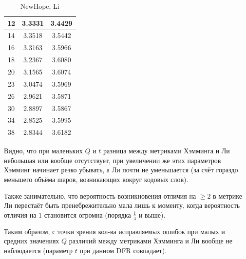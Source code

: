 \begin{table}[h]
\begin{minipage}{0.48\textwidth}
\begin{tabular}{|c|c|c|}
			12 & 3.3331 & 3.4429 \\ \hline
			14 & 3.3518 & 3.5442 \\ \hline
			16 & 3.3163 & 3.5966 \\ \hline
			18 & 3.2367 & 3.6080 \\ \hline
			20 & 3.1565 & 3.6074 \\ \hline
			23 & 3.0474 & 3.5969 \\ \hline
			26 & 2.9621 & 3.5871 \\ \hline
			30 & 2.8897 & 3.5867 \\ \hline
			34 & 2.8525 & 3.5995 \\ \hline
			38 & 2.8344 & 3.6182 \\ \hline
		\end{tabular}
		\caption*{NewHope, Li}
	\end{minipage}
\end{table}

Видно, что при маленьких $Q$ и $t$ разница между метриками Хэмминга и Ли небольшая или вообще отсутствует, при увеличении же этих параметров Хэмминг начинает резко убывать, а Ли почти не уменьшается (за счёт гораздо меньшего объёма шаров, возникающих вокруг кодовых слов).

Также занимательно, что вероятность возникновения отличия на $\geq\!2$ в метрике Ли перестаёт быть пренебрежительно мала лишь к моменту, когда вероятность отличия на $1$ становится огромна (порядка $\frac14$ и выше).

Таким образом, с точки зрения кол-ва исправляемых ошибок при малых и средних значениях $Q$ различий между метриками Хэмминга и Ли вообще не наблюдается (параметр $t$ при данном DFR совпадает).
